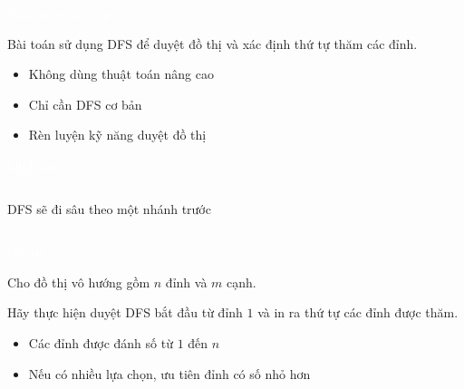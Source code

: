 \documentclass{beamer}
\title{\hlred{Bài tập DFS}}
\author{Group 3}
\date{\hlcyan{03/2026}}
\newcommand{\hlblue}[1]{\textcolor{myblue}{#1}}
\newcommand{\hlgreen}[1]{\textcolor{mygreen}{#1}}
\newcommand{\hlwhite}[1]{\textcolor{white}{#1}}
\begin{document}
\frame{\titlepage}


\begin{frame}{\hlwhite{Tổng quan bài tập}}
\begin{tcolorbox}[title=\textbf{\hlwhite{Chủ đề}}]
Bài toán sử dụng \hlblue{DFS} để duyệt đồ thị và xác định thứ tự thăm các đỉnh.
\end{tcolorbox}

\begin{itemize}
\item Không dùng thuật toán nâng cao
\item Chỉ cần DFS cơ bản
\item Rèn luyện kỹ năng duyệt đồ thị
\end{itemize}
\end{frame}


\begin{frame}{\hlwhite{Minh họa}}
\begin{columns}

\begin{tcolorbox}
\hlgreen{DFS sẽ đi sâu theo một nhánh trước}
\end{tcolorbox}
\end{columns}
\end{frame}


\begin{frame}{\hlwhite{Đề bài}}
\begin{tcolorbox}[title=\textbf{\hlwhite{DFS Traversal}}]
Cho đồ thị vô hướng gồm $n$ đỉnh và $m$ cạnh.

Hãy thực hiện duyệt \hlblue{DFS} bắt đầu từ đỉnh $1$ và in ra thứ tự các đỉnh được thăm.
\end{tcolorbox}

\begin{itemize}
\item Các đỉnh được đánh số từ $1$ đến $n$
\item Nếu có nhiều lựa chọn, ưu tiên đỉnh có số nhỏ hơn
\end{itemize}
\end{frame}
\end{document}
